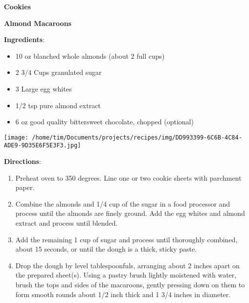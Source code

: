 \documentclass[11pt, twoside, openany]{book}
\begin{document}
{\newpage \LARGE \textbf{Cookies}} \label{cookies}\vspace{4mm}\\
\noindent\begin{minipage}[t]{\linewidth}%
{\Large\textbf{Almond Macaroons}} \label{almond-macaroons}\hfill\textit{}\\
\noindent\begin{minipage}[t]{0.78\linewidth}%
\textbf{Ingredients}:\vspace{-3mm}
\begin{multicols}{2}
\begin{itemize}\setlength\itemsep{-1mm}
\item 10 oz blanched whole almonds (about 2 full cups)
\item 2 3/4 Cups granulated sugar
\item 3 Large egg whites
\item 1/2 tsp pure almond extract
\item 6 oz good quality bittersweet chocolate, chopped (optional)
\end{itemize}
\end{multicols}
\end{minipage}
\noindent\begin{minipage}[t]{0.18\linewidth}
\centering \strut\vspace*{-\baselineskip}\newline
\texttt{[image: /home/tim/Documents/projects/recipes/img/DD993399-6C6B-4C84-ADE9-9D35E6F5E3F3.jpg]}\\
\end{minipage}\vspace{3mm}
\textbf{Directions}:
\vspace{-3mm}\begin{enumerate}\setlength\itemsep{-1mm}
\item Preheat oven to 350 degrees. Line one or two cookie sheets with parchment paper.
\item Combine the almonds and 1/4 cup of the sugar in a food processor and process until the almonds are finely ground. Add the egg whites and almond extract and process until blended.
\item Add the remaining 1 cup of sugar and process until thoroughly combined, about 15 seconds, or until the dough is a thick, sticky paste.
\item Drop the dough by level tablespoonfuls, arranging about 2 inches apart on the prepared sheet(s). Using a pastry brush lightly moistened with water, brush the tops and sides of the macaroons, gently pressing down on them to form smooth rounds about 1/2 inch thick and 1 3/4 inches in diameter.

\end{enumerate}
\end{minipage}
\end{document}
